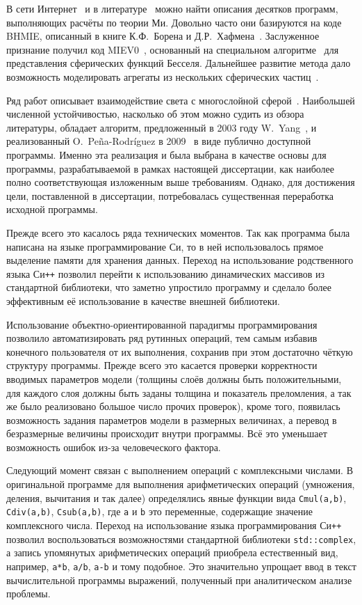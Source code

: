 В сети Интернет~\cite{scattport,wiki-mie-codes} и в
литературе~\cite{Wriedt-2009} можно найти описания десятков программ,
выполняющих расчёты по теории Ми.  Довольно часто они базируются на
коде BHMIE, описанный в книге К.Ф.~Борена и Д.Р.~Хафмена~\cite{Bohren-1983}.  Заслуженное признание получил код
MIEV0~\cite{Wiscombe-1980}, основанный на специальном
алгоритме~\cite{Lentz-76} для представления сферических функций
Бесселя. Дальнейшее развитие метода дало возможность моделировать
агрегаты из нескольких сферических частиц~\cite{Mackowski-96,Xu-95}.

Ряд работ описывает взаимодействие света с многослойной
сферой~\cite{Kai-94,Wu-97, Bhandari-85}.  Наибольшей численной
устойчивостью, насколько об этом можно судить из обзора литературы,
обладает алгоритм, предложенный в 2003 году W.~Yang~\cite{Yang-2003},
и реализованный O.~Pe\~{n}a-Rodr\'{i}guez в
2009~\cite{Pena-scattnlay-2009} в виде публично доступной программы.
Именно эта реализация и была выбрана в качестве основы для программы,
разрабатываемой в рамках настоящей диссертации, как наиболее полно
соответствующая изложенным выше требованиям.  Однако, для достижения
цели, поставленной в диссертации, потребовалась существенная
переработка исходной программы.

Прежде всего это касалось ряда технических моментов. Так как программа
была написана на языке программирование Си, то в ней использовалось
прямое выделение памяти для хранения данных.  Переход на использование
родственного языка Си\texttt{++} позволил перейти к использованию
динамических массивов из стандартной библиотеки, что заметно
упростило программу и сделало более эффективным  её использование в качестве
внешней библиотеки. 

Использование объектно-ориентированной парадигмы программирования
позволило автоматизировать ряд рутинных операций, тем самым избавив
конечного пользователя от их выполнения, сохранив при этом достаточно
чёткую структуру программы.  Прежде всего это касается проверки
корректности вводимых параметров модели (толщины слоёв должны быть
положительными, для каждого слоя должны быть заданы толщина и
показатель преломления, а так же было реализовано большое число прочих
проверок), кроме того, появилась возможность задания параметров модели
в размерных величинах, а перевод в безразмерные величины происходит
внутри программы. Всё это уменьшает возможность ошибок из-за
человеческого фактора.

Следующий момент связан с выполнением операций с комплексными числами.
В оригинальной программе для выполнения арифметических операций
(умножения, деления, вычитания и так далее) определялись явные
функции вида \verb+Cmul(a,b)+, \verb+Cdiv(a,b)+, \verb+Csub(a,b)+, где
\verb+a+ и \verb+b+ это переменные, содержащие значение комплексного
числа.  Переход на использование языка программирования Си\texttt{++}
позволил воспользоваться возможностями стандартной библиотеки
\verb+std::complex+, а запись упомянутых арифметических операций
приобрела естественный вид, например, \verb!a*b!, \verb!a/b!,
\verb!a-b! и тому подобное.  Это значительно упрощает ввод в текст
вычислительной программы выражений, полученный при аналитическом
анализе проблемы.

